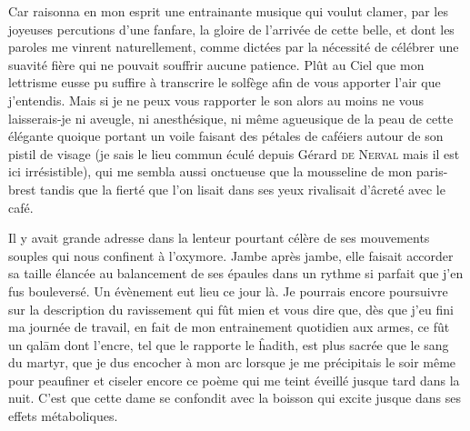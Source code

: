 \begin{prose}
  Car raisonna en mon esprit une entrainante musique qui voulut clamer, par les joyeuses percutions d’une fanfare, la gloire de l’arrivée de cette belle, et dont les paroles me vinrent naturellement, comme dictées par la nécessité de célébrer une suavité fière qui ne pouvait souffrir aucune patience. Plût au Ciel que mon lettrisme eusse pu suffire à transcrire le solfège afin de vous apporter l’air que j’entendis. Mais si je ne peux vous rapporter le son alors au moins ne vous laisserais-je ni aveugle, ni anesthésique, ni même agueusique  de la peau de cette élégante quoique portant un voile faisant des pétales de caféiers autour de son pistil de visage (je sais le lieu commun éculé depuis Gérard \textsc{de Nerval} mais il est ici irrésistible), qui me sembla aussi onctueuse que la mousseline de mon paris-brest tandis que la fierté que l’on lisait dans ses yeux rivalisait d’âcreté avec le café.

  Il y avait grande adresse dans la lenteur pourtant célère de ses mouvements souples qui nous confinent à l’oxymore. Jambe après jambe, elle faisait accorder sa taille élancée au balancement de  ses épaules dans un rythme si parfait que j’en fus bouleversé. Un évènement eut lieu ce jour là. Je pourrais encore poursuivre sur la description du ravissement qui fût mien et vous dire que, dès que j’eu fini ma journée de travail, en fait de mon entrainement quotidien aux armes, ce fût un qalām dont l’encre, tel que le rapporte le ĥadith, est plus sacrée que le sang du martyr, que je dus encocher à mon arc lorsque je  me précipitais le soir même pour peaufiner et ciseler encore ce poème qui me teint éveillé jusque tard dans la nuit. C’est que cette dame se confondit avec la boisson qui excite jusque dans ses effets métaboliques.
\end{prose}



